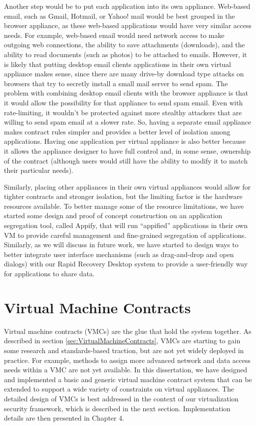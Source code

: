 Another step would be to put each application into its own appliance. Web-based email, such as Gmail, Hotmail, or Yahoo! mail would be best grouped in the browser appliance, as these web-based applications would have very similar access needs. For example, web-based email would need network access to make outgoing web connections, the ability to save attachments (downloads), and the ability to read documents (such as photos) to be attached to emails. However, it is likely that putting desktop email clients applications in their own virtual appliance makes sense, since there are many drive-by download type attacks on browsers that try to secretly install a small mail server to send spam. The problem with combining desktop email clients with the browser appliance is that it would allow the possibility for that appliance to send spam email. Even with rate-limiting, it wouldn't be protected against more stealthy attackers that are willing to send spam email at a slower rate. So, having a separate email appliance makes contract rules simpler and provides a better level of isolation among applications. Having one application per virtual appliance is also better because it allows the appliance designer to have full control and, in some sense, ownership of the contract (although users would still have the ability to modify it to match their particular needs).

Similarly, placing other appliances in their own virtual appliances would allow for tighter contracts and stronger isolation, but the limiting factor is the hardware resources available. To better manage some of the resource limitations, we have started some design and proof of concept construction on an application segregation tool, called Appify, that will run ``appified'' applications in their own VM to provide careful management and fine-grained segregation of applications. Similarly, as we will discuss in future work, we have started to design ways to better integrate user interface mechanisms (such as drag-and-drop and open dialogs) with our Rapid Recovery Desktop system to provide a user-friendly way for applications to share data.

\section{Virtual Machine Contracts}

Virtual machine contracts (VMCs) are the glue that hold the system together. As described in section \ref{sec:VirtualMachineContracts}, VMCs are starting to gain some research and standards-based traction\cite{virtual_machine_contract_ICAC09 }, but are not yet widely deployed in practice. For example, methods to assign more advanced network and data access needs within a VMC are not yet available. In this dissertation, we have designed and implemented a basic and generic virtual machine contract system that can be extended to support a wide variety of constraints on virtual appliances. The detailed design of VMCs is best addressed in the context of our virtualization security framework, which is described in the next section. Implementation details are then presented in Chapter 4.

